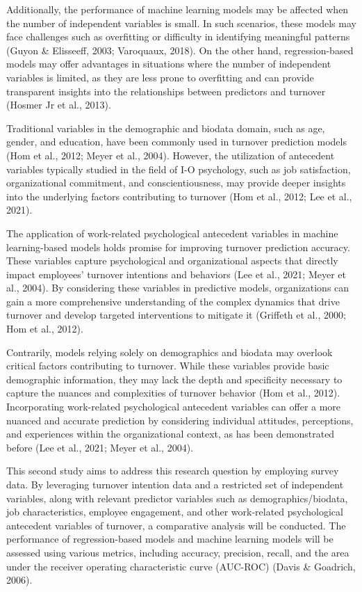 \documentclass[
  man]{apa7}
\begin{document}
Additionally, the performance of machine learning models may be affected when the number of independent variables is small.
In such scenarios, these models may face challenges such as overfitting or difficulty in identifying meaningful patterns (Guyon \& Elisseeff, 2003; Varoquaux, 2018).
On the other hand, regression-based models may offer advantages in situations where the number of independent variables is limited, as they are less prone to overfitting and can provide transparent insights into the relationships between predictors and turnover (Hosmer Jr et al., 2013).

Traditional variables in the demographic and biodata domain, such as age, gender, and education, have been commonly used in turnover prediction models (Hom et al., 2012; Meyer et al., 2004).
However, the utilization of antecedent variables typically studied in the field of I-O psychology, such as job satisfaction, organizational commitment, and conscientiousness, may provide deeper insights into the underlying factors contributing to turnover (Hom et al., 2012; Lee et al., 2021).

The application of work-related psychological antecedent variables in machine learning-based models holds promise for improving turnover prediction accuracy.
These variables capture psychological and organizational aspects that directly impact employees' turnover intentions and behaviors (Lee et al., 2021; Meyer et al., 2004).
By considering these variables in predictive models, organizations can gain a more comprehensive understanding of the complex dynamics that drive turnover and develop targeted interventions to mitigate it (Griffeth et al., 2000; Hom et al., 2012).

Contrarily, models relying solely on demographics and biodata may overlook critical factors contributing to turnover.
While these variables provide basic demographic information, they may lack the depth and specificity necessary to capture the nuances and complexities of turnover behavior (Hom et al., 2012).
Incorporating work-related psychological antecedent variables can offer a more nuanced and accurate prediction by considering individual attitudes, perceptions, and experiences within the organizational context, as has been demonstrated before (Lee et al., 2021; Meyer et al., 2004).

This second study aims to address this research question by employing survey data.
By leveraging turnover intention data and a restricted set of independent variables, along with relevant predictor variables such as demographics/biodata, job characteristics, employee engagement, and other work-related psychological antecedent variables of turnover, a comparative analysis will be conducted.
The performance of regression-based models and machine learning models will be assessed using various metrics, including accuracy, precision, recall, and the area under the receiver operating characteristic curve (AUC-ROC) (Davis \& Goadrich, 2006).
\end{document}
